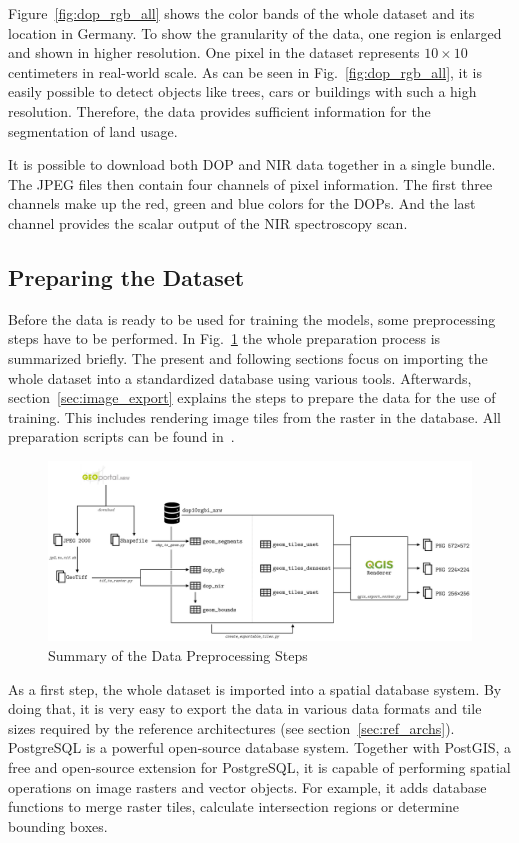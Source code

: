 Figure~\ref{fig:dop_rgb_all} shows the color bands of the whole dataset and its location in Germany. To show the granularity of the data, one region is enlarged and shown in higher resolution. One pixel in the dataset represents $10\times 10$ centimeters in real-world scale. As can be seen in Fig.~\ref{fig:dop_rgb_all}, it is easily possible to detect objects like trees, cars or buildings with such a high resolution. Therefore, the data provides sufficient information for the segmentation of land usage.

It is possible to download both DOP and NIR data together in a single bundle. The JPEG files then contain four channels of pixel information. The first three channels make up the red, green and blue colors for the DOPs. And the last channel provides the scalar output of the NIR spectroscopy scan.

\subsection{Preparing the Dataset}
Before the data is ready to be used for training the models, some preprocessing steps have to be performed. In Fig.~\ref{fig:data_preprocessing} the whole preparation process is summarized briefly. The present and following sections focus on importing the whole dataset into a standardized database using various tools. Afterwards, section~\ref{sec:image_export} explains the steps to prepare the data for the use of training. This includes rendering image tiles from the raster in the database. All preparation scripts can be found in~\cite{thesis-code20}.

\begin{figure}[h]
    \centering
    \includegraphics[width=\textwidth]{images/data_preprocessing}
    \caption{Summary of the Data Preprocessing Steps}
    \label{fig:data_preprocessing}
\end{figure}

As a first step, the whole dataset is imported into a spatial database system. By doing that, it is very easy to export the data in various data formats and tile sizes required by the reference architectures (see section~\ref{sec:ref_archs}). PostgreSQL is a powerful open-source database system. Together with PostGIS, a free and open-source extension for PostgreSQL, it is capable of performing spatial operations on image rasters and vector objects. For example, it adds database functions to merge raster tiles, calculate intersection regions or determine bounding boxes.


